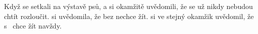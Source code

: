 \documentclass{article}
\begin{document}
Když se setkali na výstavě psů, 
a  si okamžitě uvědomili, že
se už nikdy nebudou chtít rozloučit.  si
uvědomila, že bez  nechce žít.
 si ve stejný okamžik uvědomil, že
s~ chce žít navždy.
\end{document}
